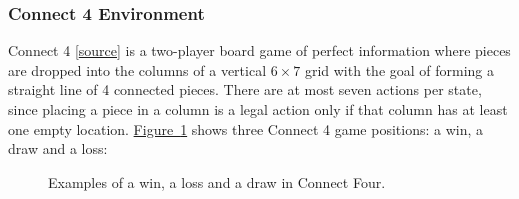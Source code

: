 \documentclass{article}
\newcommand{\GithubURL}[1]{[\href{https://github.com/davidrobles/mlnd-capstone-code/blob/master/#1}{source}]}
\begin{document}

\subsubsection{Connect 4 Environment}

Connect 4 \GithubURL{capstone/game/games/connect4.py} is a two-player board game of perfect
information where pieces are dropped into the columns of a vertical $6 \times 7$ grid with the goal
of forming a straight line of 4 connected pieces. There are at most seven actions per state, since
placing a piece in a column is a legal action only if that column has at least one empty location.
\hyperref[fig:c4-env]{Figure~\ref*{fig:c4-env}} shows three Connect 4 game positions: a win, a draw
and a loss:


\begin{figure}[!h]
    \centering
     \hspace{0.1in}
     \hspace{0.1in}
    \caption{Examples of a win, a loss and a draw in Connect Four.}
    \label{fig:c4-env}
\end{figure}
\end{document}
